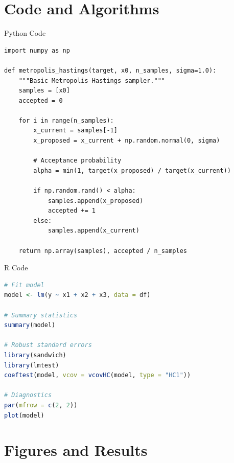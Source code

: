 \documentclass[aspectratio=169]{beamer}
\begin{document}
\section{Code and Algorithms}

\begin{frame}[fragile]{Python Code}
  \begin{lstlisting}[style=code, caption=Metropolis-Hastings Implementation]
import numpy as np

def metropolis_hastings(target, x0, n_samples, sigma=1.0):
    """Basic Metropolis-Hastings sampler."""
    samples = [x0]
    accepted = 0

    for i in range(n_samples):
        x_current = samples[-1]
        x_proposed = x_current + np.random.normal(0, sigma)

        # Acceptance probability
        alpha = min(1, target(x_proposed) / target(x_current))

        if np.random.rand() < alpha:
            samples.append(x_proposed)
            accepted += 1
        else:
            samples.append(x_current)

    return np.array(samples), accepted / n_samples
  \end{lstlisting}
\end{frame}

\begin{frame}[fragile]{R Code}
  \begin{lstlisting}[language=R, caption=Linear Regression with Diagnostics]
# Fit model
model <- lm(y ~ x1 + x2 + x3, data = df)

# Summary statistics
summary(model)

# Robust standard errors
library(sandwich)
library(lmtest)
coeftest(model, vcov = vcovHC(model, type = "HC1"))

# Diagnostics
par(mfrow = c(2, 2))
plot(model)
  \end{lstlisting}
\end{frame}

\section{Figures and Results}
\end{document}

